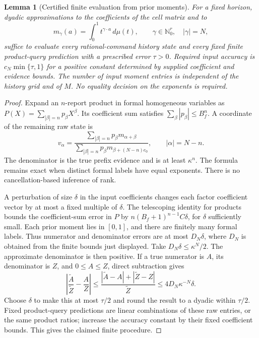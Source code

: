 \documentclass[11pt]{amsart}
\newtheorem{lemma}[theorem]{Lemma}
\theoremstyle{definition}\newtheorem{definition}[theorem]{Definition}
\theoremstyle{remark}\newtheorem{remark}[theorem]{Remark}
\begin{document}
\begin{lemma}[Certified finite evaluation from prior moments]
\label{lem:finite-moments}
For a fixed horizon, dyadic approximations to the coefficients of the
cell matrix and to
\begin{equation}\label{eq:finite-prior-table}
 m_\gamma(a)=\int_0^1t^{\gamma\cdot a}\,d\mu(t),\qquad
 \gamma\in\mathbb N_0^r,\quad |\gamma|=N,
\end{equation}
suffice to evaluate every rational-command history state and every fixed
finite product-query prediction with a prescribed error $\tau>0$.
Required input accuracy is $c_N\min\{\tau,1\}$ for a positive
constant determined by supplied coefficient and evidence bounds. The
number of input moment entries is independent of the history grid and
of $M$. No equality decision on the exponents is required.
\end{lemma}
\begin{proof}
Expand an $n$-report product in formal homogeneous variables as
$P(X)=\sum_{|\beta|=n}p_\beta X^\beta$. Its coefficient sum satisfies
$\sum_\beta|p_\beta|\le B_f^n$. A coordinate of the remaining raw
state is
\begin{equation}\label{eq:finite-evaluation}
 v_\alpha=
 \frac{\sum_{|\beta|=n}p_\beta m_{\alpha+\beta}}
      {\sum_{|\beta|=n}p_\beta m_{\beta+(N-n)e_0}},
 \qquad |\alpha|=N-n.
\end{equation}
The denominator is the true prefix evidence and is at least $\kappa^n$.
The formula remains exact when distinct formal labels have equal
exponents. There is no cancellation-based inference of rank.

A perturbation of size $\delta$ in the input coefficients changes each
factor coefficient vector by at most a fixed multiple of $\delta$.
The telescoping identity for products bounds the coefficient-sum error
in $P$ by $n(B_f+1)^{n-1}C\delta$, for $\delta$ sufficiently small.
Each prior moment lies in $[0,1]$, and there are finitely many formal
labels. Thus numerator and denominator errors are at most $D_N\delta$,
where $D_N$ is obtained from the finite bounds just displayed.
Take $D_N\delta\le\kappa^N/2$. The approximate denominator is then
positive. If a true numerator is $A$, its denominator is $Z$, and
$0\le A\le Z$, direct subtraction gives
\[
 \left|\frac{\widetilde A}{\widetilde Z}-\frac AZ\right|
 \le\frac{|\widetilde A-A|+|\widetilde Z-Z|}{\widetilde Z}
 \le4D_N\kappa^{-N}\delta.
\]
Choose $\delta$ to make this at most $\tau/2$ and round the result
to a dyadic within $\tau/2$. Fixed product-query predictions are
linear combinations of these raw entries, or the same product ratios;
increase the accuracy constant by their fixed coefficient bounds.
This gives the claimed finite procedure.
\end{proof}
\end{document}
